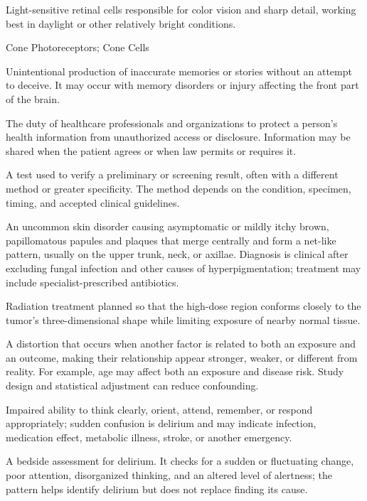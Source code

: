  Light-sensitive retinal cells responsible for color vision and sharp detail, working best in daylight or other relatively bright conditions.

\synonyms
Cone Photoreceptors; Cone Cells

 Unintentional production of inaccurate memories or stories without an attempt to deceive. It may occur with memory disorders or injury affecting the front part of the brain.

 The duty of healthcare professionals and organizations to protect a person's health information from unauthorized access or disclosure. Information may be shared when the patient agrees or when law permits or requires it.

 A test used to verify a preliminary or screening result, often with a different method
or greater specificity. The method depends on the condition, specimen, timing, and accepted clinical guidelines.

 An uncommon skin disorder causing asymptomatic or mildly itchy brown, papillomatous papules and plaques that merge centrally and form a net-like pattern, usually on the upper trunk, neck, or axillae. Diagnosis is clinical after excluding fungal infection and other causes of hyperpigmentation; treatment may include specialist-prescribed antibiotics.

 Radiation treatment planned so that the high-dose region conforms closely to the tumor's three-dimensional shape while limiting exposure of nearby normal tissue.

 A distortion that occurs when another factor is related to both an exposure and an outcome, making their relationship appear stronger, weaker, or different from reality. For example, age may affect both an exposure and disease risk. Study design and statistical adjustment can reduce confounding.

 Impaired ability to think clearly, orient, attend, remember, or respond appropriately; sudden confusion is delirium and may indicate infection, medication effect, metabolic illness, stroke, or another emergency.

 A bedside assessment for delirium. It checks for a sudden or fluctuating change, poor attention, disorganized thinking, and an altered level of alertness; the pattern helps identify delirium but does not replace finding its cause.

